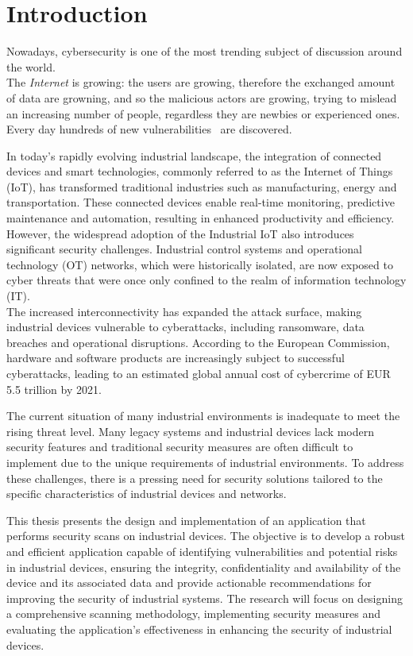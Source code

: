 \chapter{Introduction}
\label{cha:intro}

Nowadays, cybersecurity is one of the most trending subject of discussion around the world.~\cite{trends-computer-science}\\

The \textit{Internet} is growing: the users are growing, therefore the exchanged amount of data are growning, and so the malicious actors are growing, trying to mislead an increasing number of people, regardless they are newbies or experienced ones. Every day hundreds of new vulnerabilities~\cite{cve-details-db} are discovered.

In today's rapidly evolving industrial landscape, the integration of connected devices and smart technologies, commonly referred to as the Internet of Things (IoT), has transformed traditional industries such as manufacturing, energy and transportation. These connected devices enable real-time monitoring, predictive maintenance and automation, resulting in enhanced productivity and efficiency. \\
However, the widespread adoption of the Industrial IoT also introduces significant security challenges. Industrial control systems and operational technology (OT) networks, which were historically isolated, are now exposed to cyber threats that were once only confined to the realm of information technology (IT). \\
The increased interconnectivity has expanded the attack surface, making industrial devices vulnerable to cyberattacks, including ransomware, data breaches and operational disruptions. According to the European Commission, hardware and software products are increasingly subject to successful cyberattacks, leading to an estimated global annual cost of cybercrime of EUR 5.5 trillion by 2021.~\cite{cra-eu}

The current situation of many industrial environments is inadequate to meet the rising threat level. Many legacy systems and industrial devices lack modern security features and traditional security measures are often difficult to implement due to the unique requirements of industrial environments. To address these challenges, there is a pressing need for security solutions tailored to the specific characteristics of industrial devices and networks.

This thesis presents the design and implementation of an application that performs security scans on industrial devices. The objective is to develop a robust and efficient application capable of identifying vulnerabilities and potential risks in industrial devices, ensuring the integrity, confidentiality and availability of the device and its associated data and provide actionable recommendations for improving the security of industrial systems. The research will focus on designing a comprehensive scanning methodology, implementing security measures and evaluating the application's effectiveness in enhancing the security of industrial devices.

